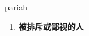 
\begin{frame}
{\huge pariah}
\begin{center}
\begin{enumerate}\Large
  \item \textbf{被排斥或鄙视的人}
\end{enumerate}
\end{center}
\end{frame}
